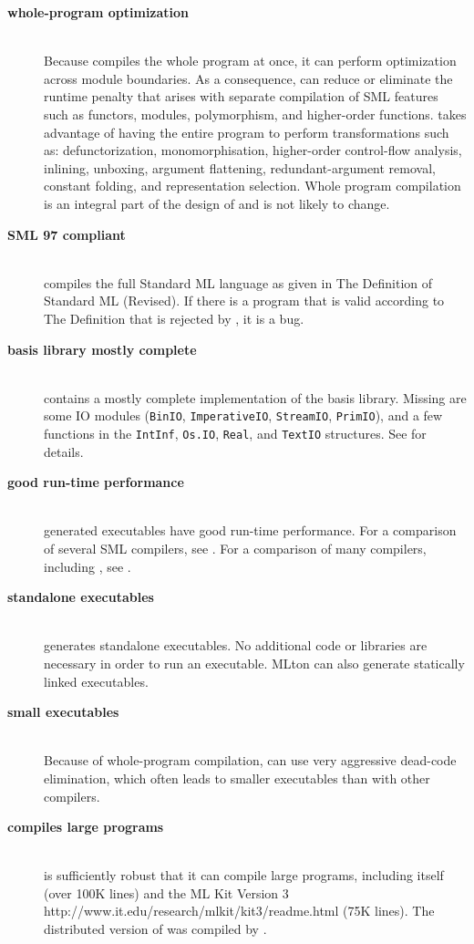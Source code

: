 
\newcommand{\feature}[1]{\item[\bf #1]\hspace{1in}\\}
\begin{description}
\feature{whole-program optimization}
Because {\mlton} compiles the whole program at once, it can perform optimization
across module boundaries.  As a consequence, {\mlton} can reduce or eliminate
the runtime penalty that arises with separate compilation of SML features such
as functors, modules, polymorphism, and higher-order functions.  {\mlton} takes
advantage of having the entire program to perform transformations such as:
defunctorization, monomorphisation, higher-order control-flow analysis,
inlining, unboxing, argument flattening, redundant-argument removal, constant
folding, and representation selection.  Whole program compilation is an integral
part of the design of {\mlton} and is not likely to change.

\feature{SML 97 compliant}
{\mlton} compiles the full Standard ML language as given in The
Definition of Standard ML (Revised)\cite{MTHM97}.  If there is a
program that is valid according to The Definition that is rejected by
{\mlton}, it is a bug.

\feature{basis library mostly complete}
{\mlton} contains a mostly complete implementation of the basis library.
Missing are some IO modules ({\tt BinIO}, {\tt ImperativeIO}, {\tt StreamIO},
{\tt PrimIO}), and a few functions in the {\tt IntInf}, {\tt Os.IO}, {\tt Real},
and {\tt TextIO} structures.  See  for details.

\feature{good run-time performance}
{\mlton} generated executables have good run-time performance.
For a comparison of several SML compilers, see
.
For a comparison of many compilers, including {\mlton}, see
.

\feature{standalone executables}
{\mlton} generates standalone executables.  No additional code or
libraries are necessary in order to run an executable.  MLton can also generate
statically linked executables.

\feature{small executables}
Because of whole-program compilation, {\mlton} can use very aggressive 
dead-code elimination, which often leads to smaller executables than
with other compilers.

\feature{compiles large programs}
{\mlton} is sufficiently robust that it can compile large programs,
including itself (over 100K lines) and the
\htmladdnormallink
  {ML Kit Version 3}
  {http://www.it.edu/research/mlkit/kit3/readme.html}
(75K lines).
The distributed version of {\mlton} was compiled by {\mlton}.


\end{description}
